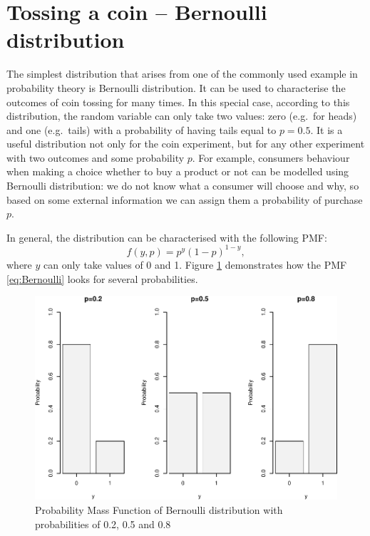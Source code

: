 \documentclass[
]{book}
\theoremstyle{definition}
\theoremstyle{definition}
\theoremstyle{definition}
\theoremstyle{definition}
\theoremstyle{remark}
\begin{document}
\hypertarget{distributionBernoulli}{%
\section{Tossing a coin -- Bernoulli distribution}\label{distributionBernoulli}}

The simplest distribution that arises from one of the commonly used example in probability theory is Bernoulli distribution. It can be used to characterise the outcomes of coin tossing for many times. In this special case, according to this distribution, the random variable can only take two values: zero (e.g.~for heads) and one (e.g.~tails) with a probability of having tails equal to \(p=0.5\). It is a useful distribution not only for the coin experiment, but for any other experiment with two outcomes and some probability \(p\). For example, consumers behaviour when making a choice whether to buy a product or not can be modelled using Bernoulli distribution: we do not know what a consumer will choose and why, so based on some external information we can assign them a probability of purchase \(p\).

In general, the distribution can be characterised with the following PMF:
\begin{equation}
    f(y, p) = p^y (1-p)^{1-y},
    \label{eq:BernoulliPMF}
\end{equation}
where \(y\) can only take values of 0 and 1. Figure \ref{fig:bernoulliPMF} demonstrates how the PMF \eqref{eq:Bernoulli} looks for several probabilities.

\begin{figure}
\centering
\includegraphics{Svetunkov---Statistics-for-Business-Analytics_files/figure-latex/bernoulliPMF-1.pdf}
\caption{\label{fig:bernoulliPMF}Probability Mass Function of Bernoulli distribution with probabilities of 0.2, 0.5 and 0.8}
\end{figure}
\end{document}

